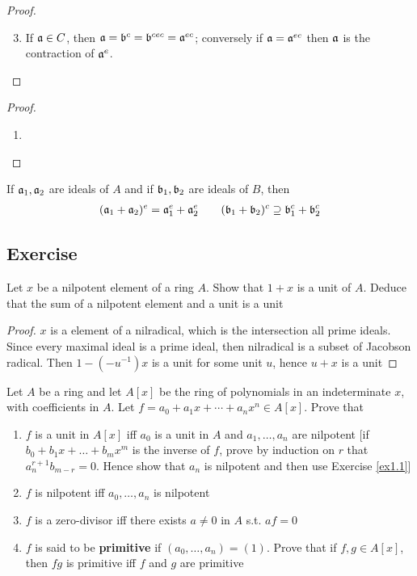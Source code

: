 \documentclass[11pt]{article}
\begin{document}
\begin{proof}
\begin{enumerate}
\setcounter{enumi}{2}
\item If \(\mathfrak{a}\in C\), then \(\mathfrak{a}=\mathfrak{b}^c=\mathfrak{b}^{cec}=\mathfrak{a}^{ec}\); conversely if \(\mathfrak{a}=\mathfrak{a}^{ec}\) then \(\mathfrak{a}\) is the
contraction of \(\mathfrak{a}^e\).
\end{enumerate}
\end{proof}

\begin{proof}
\begin{enumerate}
\item 
\end{enumerate}
\end{proof}

\begin{exercise}
If \(\mathfrak{a}_1,\mathfrak{a}_2\) are ideals of \(A\) and if \(\mathfrak{b}_1,\mathfrak{b}_2\) are ideals of \(B\), then
\begin{alignat*}{2}
&(\mathfrak{a}_1+\mathfrak{a}_2)^e=\mathfrak{a}_1^e+\mathfrak{a}_2^e\quad&&(\mathfrak{b}_1+\mathfrak{b}_2)^c\supseteq\mathfrak{b}_1^c+\mathfrak{b}_2^c\\
\end{alignat*}
\end{exercise}
\subsection{Exercise}
\label{sec:org1c81075}
\begin{exercise}
\label{ex1.1}
Let \(x\) be a nilpotent element of a ring \(A\). Show that \(1+x\) is a unit of \(A\). Deduce
that the sum of a nilpotent element and a unit is a unit
\end{exercise}

\begin{proof}
\(x\) is a element of a nilradical, which is the intersection all prime ideals. Since every
maximal ideal is a prime ideal, then nilradical is a subset of Jacobson radical.
Then \(1-(-u^{-1})x\) is a unit for some unit \(u\), hence \(u+x\) is a unit
\end{proof}

\begin{exercise}
\label{ex1.2}
Let \(A\) be a ring and let \(A[x]\) be the ring of polynomials in an indeterminate \(x\), with
coefficients in \(A\). Let \(f=a_0+a_1x+\cdots+a_nx^n\in A[x]\). Prove that
\begin{enumerate}
\item \(f\) is a unit in \(A[x]\) iff \(a_0\) is a unit in \(A\) and \(a_1,\dots,a_n\) are nilpotent [if
\(b_0+b_1x+\dots+b_mx^m\) is the inverse of \(f\), prove by induction on \(r\)
that \(a_n^{r+1}b_{m-r}=0\). Hence show that \(a_n\) is nilpotent and then use Exercise \ref{ex1.1}]
\item \(f\) is nilpotent iff \(a_0,\dots,a_n\) is nilpotent
\item \(f\) is a zero-divisor iff there exists \(a\neq 0\) in \(A\) s.t. \(af=0\)
\item \(f\) is said to be \textbf{primitive} if \((a_0,\dots,a_n)=(1)\). Prove that if \(f,g\in A[x]\),
then \(fg\) is primitive iff \(f\) and \(g\) are primitive
\end{enumerate}
\end{exercise}
\end{document}
